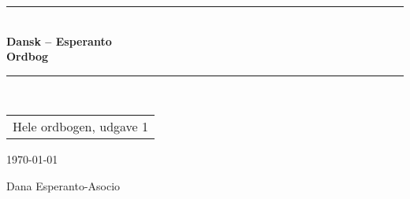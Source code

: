 \begin{titlepage}
\centering \parindent=0pt



\renewcommand{\sectionmark}[1]{} 


\newcommand{\HRule}{\rule{\textwidth}{1mm}}
 \HRule\\[0.5cm]\Huge
\bfseries
Dansk -- Esperanto \\[0.4cm]
Ordbog
\HRule\\[2cm]
  \vspace{0.6cm}
\large   \begin{center}  %
  \begin{tabular}{c}
\Large{Hele ordbogen, udgave 1}
  \end{tabular}
  \end{center}
  \vspace{1.0cm} %
\begin{center}
\today
\end{center}

\vspace{1cm}
 \normalsize %

\small
Dana Esperanto-Asocio\\[1cm]

\end{titlepage}